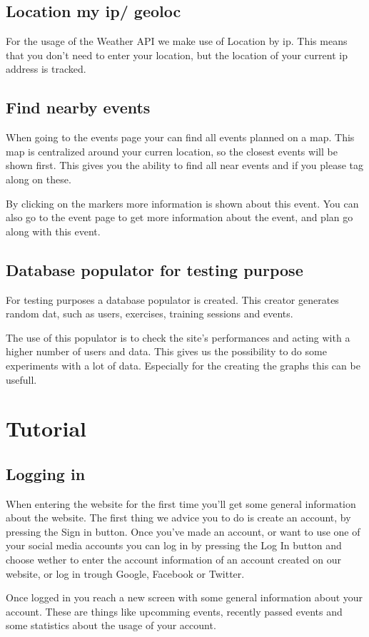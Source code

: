 \documentclass[11pt,a4paper]{scrartcl}
\begin{document}
\subsection{Location my ip/ geoloc}
For the usage of the Weather API we make use of Location by ip. This means that you don't need to enter your location, but the location
of your current ip address is tracked.
\subsection{Find nearby events}
When going to the events page your can find all events planned on a map. This map is centralized around your curren location, so the 
closest events will be shown first. This gives you the ability to find all near events and if you please tag along on these.

By clicking on the markers more information is shown about this event. You can also go to the event page to get more information about
the event, and plan go along with this event.
\subsection{Database populator for testing purpose}
For testing purposes a database populator is created. This creator generates random dat, such as users, exercises, training sessions and
events. 

The use of this populator is to check the site's performances and acting with a higher number of users and data. This gives us the 
possibility to do some experiments with a lot of data. Especially for the creating the graphs this can be usefull.
\section{Tutorial}
\subsection{Logging in}
When entering the website for the first time you'll get some general information about the website. The first thing we advice you to do is create
an account, by pressing the Sign in button. Once you've made an account, or want to use one of your social media accounts you can log in by
pressing the Log In button and choose wether to enter the account information of an account created on our website, or log in trough Google,
Facebook or Twitter.

Once logged in you reach a new screen with some general information about your account. These are things like upcomming events, recently passed 
events and some statistics about the usage of your account.
\end{document}
